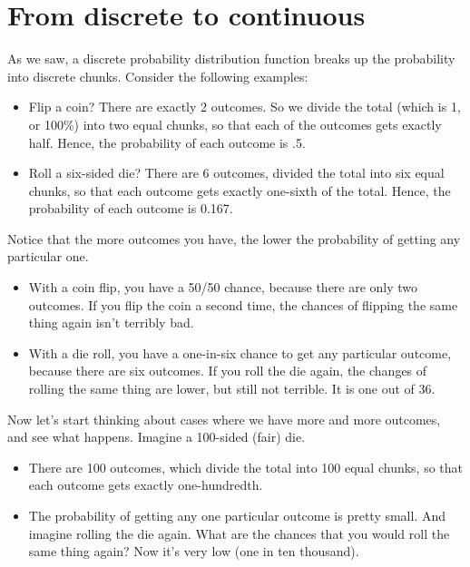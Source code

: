 \documentclass[../../../main.tex]{subfiles}
\begin{document}
\section{From discrete to continuous}

As we saw, a discrete probability distribution function breaks up the probability into discrete chunks. Consider the following examples:

\begin{itemize}
  \item Flip a coin? There are exactly 2 outcomes. So we divide the total (which is 1, or 100\%) into two equal chunks, so that each of the outcomes gets exactly half. Hence, the probability of each outcome is .5.
  \item Roll a six-sided die? There are 6 outcomes, divided the total into six equal chunks, so that each outcome gets exactly one-sixth of the total. Hence, the probability of each outcome is 0.167.
\end{itemize}

Notice that the more outcomes you have, the lower the probability of getting any particular one. 

\begin{itemize}
  \item With a coin flip, you have a 50/50 chance, because there are only two outcomes. If you flip the coin a second time, the chances of flipping the same thing again isn't terribly bad.
  \item With a die roll, you have a one-in-six chance to get any particular outcome, because there are six outcomes. If you roll the die again, the changes of rolling the same thing are lower, but still not terrible. It is one out of 36. 
\end{itemize}

Now let's start thinking about cases where we have more and more outcomes, and see what happens. Imagine a 100-sided (fair) die.

\begin{itemize}
  \item There are 100 outcomes, which divide the total into 100 equal chunks, so that each outcome gets exactly one-hundredth.
  \item The probability of getting any one particular outcome is pretty small. And imagine rolling the die again. What are the chances that you would roll the same thing again? Now it's very low (one in ten thousand).
\end{itemize}
\end{document}
